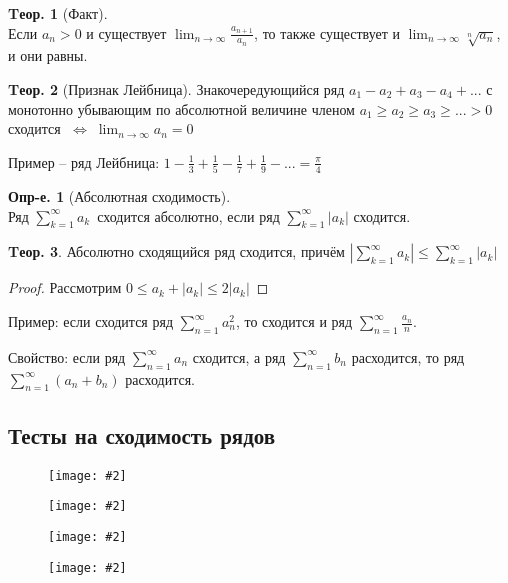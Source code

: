 \documentclass[a4paper,12pt]{article}
\numberwithin{figure}{section}
\theoremstyle{definition}
\newtheorem{definition}{Опр-е.}[section]
\theoremstyle{definition}
\newtheorem{theorem}{Tеор.}[section]
\def\DS{\displaystyle}
\def\ntoinf{n \to \infty}
\def\leqs{\leqslant}
\def\geqs{\geqslant}
\def\iff {$\;\Longleftrightarrow\;$}
\def\rowak{$\DS\sum_{k=1}^{\infty}a_k$}
\newcommand\CenterFigure[2]{
	\begin{figure}[H]
		\centering
		\texttt{[image: \#2]}
	\end{figure}
}
\begin{document}
\begin{theorem}[Факт] \ \\
	Если $a_n>0$ и существует $\DS \lim_{\ntoinf} \frac{a_{n+1}}{a_n}$,
	то также существует и $\DS \lim_{\ntoinf} \sqrt[n]{a_n}$, и они равны.
\end{theorem}

\begin{theorem}[Признак Лейбница]
	Знакочередующийся ряд $a_1 - a_2 + a_3 - a_4 + ...$ с монотонно убывающим по абсолютной величине членом $a_1 \geqs a_2 \geqs a_3 \geqs ... > 0$
	сходится \iff $\DS \lim_{\ntoinf} a_n = 0$
\end{theorem}

Пример -- ряд Лейбница: $\DS 1-\frac13+\frac15-\frac17+\frac19-... = \frac\pi4$

\begin{definition}[Абсолютная сходимость] \ \\
	Ряд \rowak $\,$ сходится абсолютно, если ряд $\DS\sum_{k=1}^{\infty}|a_k|$ сходится.
\end{definition}

\begin{theorem}
	Абсолютно сходящийся ряд сходится, причём
	$\DS \left|\sum_{k=1}^{\infty}a_k\right| \leqs \sum_{k=1}^{\infty}|a_k|$
\end{theorem}
\begin{proof}
	Рассмотрим $0 \leqs a_k + |a_k| \leqs 2|a_k|$
\end{proof}

\bigbreak
Пример: если сходится ряд $\DS \sum_{n=1}^{\infty}a_n^2$,
то сходится и ряд $\DS \sum_{n=1}^{\infty}\frac{a_n}n$.

\bigbreak
Свойство: если ряд $\DS \sum_{n=1}^{\infty}a_n$ сходится,
а ряд $\DS \sum_{n=1}^{\infty}b_n$ расходится,
то ряд $\DS \sum_{n=1}^{\infty} (a_n + b_n)$ расходится.


\subsection{Тесты на сходимость рядов}

\CenterFigure{\linewidth}{rows-test-1.png}

\CenterFigure{\linewidth}{rows-test-2.png}

\CenterFigure{\linewidth}{rows-test-3.png}

\CenterFigure{\linewidth}{rows-test-4.png}
\end{document}
